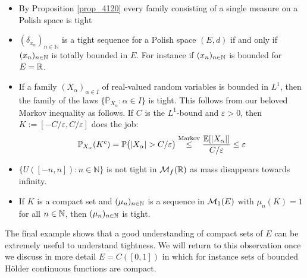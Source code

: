 \begin{example}
	\begin{itemize}
		\item
			By Proposition \ref{prop_4120} every family consisting of a single measure on a Polish space is tight
		\item
			$(\delta_{x_n})_{n\in\mathbb{N}}$ is a tight sequence for a Polish space $(E,d)$ if and only if $(x_n)_{n\in\mathbb{N}}$ is totally bounded in $E$. For instance if $(x_n)_{n\in\mathbb{N}}$ is bounded for $E=\mathbb{R}$.
		\item
			If a family $(X_\alpha)_{\alpha\in I}$ of real-valued random variables is bounded in $L^1$, then the family of the laws $\{ \mathbb{P}_{X_\alpha} \colon \alpha\in I \}$ is tight. This follows from our beloved Markov inequality as follows. If $C$ is the $L^1$-bound and $\varepsilon>0$, then $K:=[-C/\varepsilon, C/\varepsilon]$ does the job:
			\begin{align*}
				\mathbb{P}_{X_\alpha}(K^c)
				= \mathbb{P}\big(\lvert X_\alpha \rvert > C/\varepsilon\big) \overset{\text{Markov}}{\leq} \frac{\mathbb{E}[\lvert X_\alpha \rvert ]}{C/\varepsilon} \leq \varepsilon
			\end{align*}
		\item
			$\{ U([-n,n])\colon n\in \mathbb{N} \}$ is not tight in $\mathcal{M}_f(\mathbb{R})$ as mass disappears towards infinity.
					\item If $K$ is a compact set and $(\mu_n)_{n\in\mathbb{N}}$ is a sequence in $\mathcal{M}_1(E)$ with $\mu_n(K)=1$ for all $n\in\mathbb{N}$, then $(\mu_n)_{n\in\mathbb{N}}$ is tight.
	\end{itemize}
\end{example}
The final example shows that a good understanding of compact sets of $E$ can be extremely useful to understand tightness. We will return to this observation once we discuss in more detail $E=C([0,1])$ in which for instance sets of bounded H\"older continuous functions are compact.\smallskip

